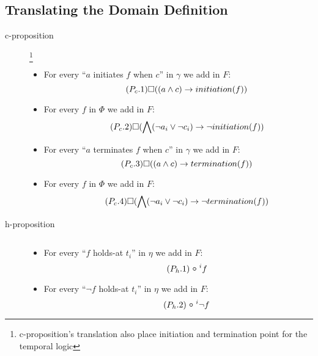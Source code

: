 \subsection{Translating the Domain Definition}\label{sec:trans_def_ltl}

\begin{description}
  \item[c-proposition]\footnote{c-proposition's translation also place initiation and termination point for the temporal logic}
  \begin{itemize}
    \item For every “$a$ initiates $f$ when $c$” in $\gamma$ we add in $F$:
    \begin{equation}\tag{$P_c.1$}
      \square((a\land c)\rightarrow initiation(f))
    \end{equation}
    \item For every $f$ in $\Phi$ we add in $F$:
    \begin{equation}\tag{$P_c.2$}
      \square(\bigwedge(\neg a_i\lor \neg c_i)\rightarrow \neg initiation(f))
    \end{equation}
    \item For every “$a$ terminates $f$ when $c$” in $\gamma$ we add in $F$:
    \begin{equation}\tag{$P_c.3$}
      \square((a\land c)\rightarrow termination(f))
    \end{equation}
    \item For every $f$ in $\Phi$ we add in $F$:
    \begin{equation}\tag{$P_c.4$}
      \square(\bigwedge(\neg a_i\lor \neg c_i)\rightarrow \neg termination(f))
    \end{equation}
  \end{itemize}
  \item[h-proposition] $ $
  \begin{itemize}
    \item For every “$f$ holds-at $t_i$” in $\eta$ we add in $F$:
    \begin{equation}\tag{$P_h.1$}
      \next^{i}f
    \end{equation}
    \item For every “$\neg f$ holds-at $t_i$” in $\eta$ we add in $F$:
    \begin{equation}\tag{$P_h.2$}
      \next^{i} \neg f

\end{equation}
\end{itemize}
\end{description}
